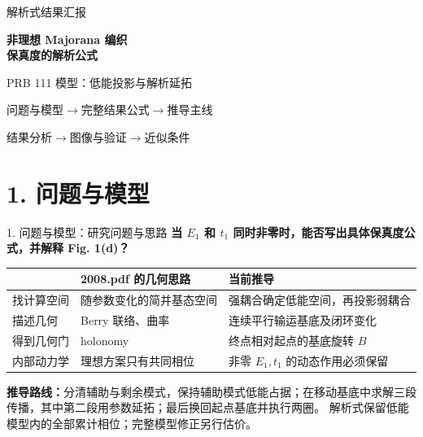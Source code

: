\documentclass[aspectratio=169,11pt]{beamer}
\newcommand{\PresenterName}{}
\newcommand{\PresentationDate}{}
\begin{document}
\begin{frame}[plain]
  \vspace{.65cm}
  {\color{Teal}\large 解析式结果汇报}\par\vspace{.45cm}
  {\huge\bfseries 非理想 Majorana 编织\\[.2cm]保真度的解析公式}\par
  \vspace{.35cm}
  {\large PRB 111 模型：低能投影与解析延拓}\par
  \vspace{.4cm}{\color{Teal}\rule{2.5cm}{2pt}}\par\vspace{.3cm}
  \PresenterName\quad\PresentationDate\par\vspace{.4cm}
  \small
  问题与模型\quad$\longrightarrow$\quad 完整结果公式\quad$\longrightarrow$\quad 推导主线\par\medskip
  结果分析\quad$\longrightarrow$\quad 图像与验证\quad$\longrightarrow$\quad 近似条件
\end{frame}

\section{1. 问题与模型}

\begin{frame}[t]{1. 问题与模型：研究问题与思路}
  \textbf{当 $E_1$ 和 $t_1$ 同时非零时，能否写出具体保真度公式，并解释 Fig. 1(d)？}
  \vspace{.15cm}
  \begin{center}
    \small\renewcommand{\arraystretch}{1.35}
    \begin{tabular}{p{2.0cm}p{4.6cm}p{5.6cm}}
      \toprule & 2008.pdf 的几何思路 & 当前推导\\\midrule
      找计算空间 & 随参数变化的简并基态空间 & 强耦合确定低能空间，再投影弱耦合\\
      描述几何 & Berry 联络、曲率 & 连续平行输运基底及闭环变化\\
      得到几何门 & holonomy & 终点相对起点的基底旋转 $B$\\
      内部动力学 & 理想方案只有共同相位 & 非零 $E_1,t_1$ 的动态作用必须保留\\\bottomrule
    \end{tabular}
  \end{center}
  \small
  \textbf{推导路线：}分清辅助与剩余模式，保持辅助模式低能占据；在移动基底中求解三段传播，其中第二段用参数延拓；最后换回起点基底并执行两圈。
  \vspace{.15cm}
  解析式保留低能模型内的全部累计相位；完整模型修正另行估价。
\end{frame}
\end{document}
